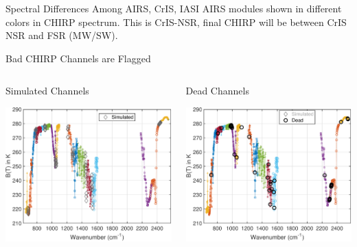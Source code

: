 \documentclass[10pt,t]{beamer}
\begin{document}
\begin{frame}[label={sec:org8da6082}]{Spectral Differences Among AIRS, CrIS, IASI}
AIRS modules shown in different colors in CHIRP spectrum. This is CrIS-NSR, final CHIRP will be between CrIS NSR and FSR (MW/SW).
\end{frame}

\begin{frame}[label={sec:orgd9668e0}]{Bad CHIRP Channels are Flagged}
\vspace{-0.35in}
\begin{columns}
\begin{column}{0.55\columnwidth}
\begin{block}{\footnotesize Simulated Channels}
\vspace{-0.05in}
\vspace{-0.05in}
\begin{center}
\includegraphics[width=0.77\linewidth]{./Figs/Pdf/a2c_full_show_sim.pdf}
\end{center}
\end{block}
\end{column}

\begin{column}{0.55\columnwidth}
\begin{block}{\footnotesize Dead Channels}
\vspace{-0.05in}
\vspace{-0.05in}
\begin{center}
\includegraphics[width=0.77\linewidth]{./Figs/Pdf/a2c_full_show_dead.pdf}
\end{center}
\end{block}
\end{column}
\end{columns}


\end{frame}
\end{document}
